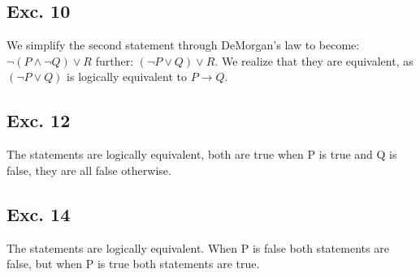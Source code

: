 \documentclass[12pt]{article}
\begin{document}
\subsection*{Exc. 10}
We simplify the second statement through DeMorgan's law to become: 
$\neg (P \land \neg Q) \lor R$ further: $(\neg P \lor Q) \lor R$. We realize that they are equivalent, as 
$(\neg P \lor Q)$ is logically equivalent to $P \rightarrow Q$.


\subsection*{Exc. 12}
The statements are logically equivalent, both are true when P is true and Q is false,
they are all false otherwise.

\subsection*{Exc. 14}
The statements are logically equivalent. When P is false both statements are false,
but when P is true both statements are true. 
\end{document}
